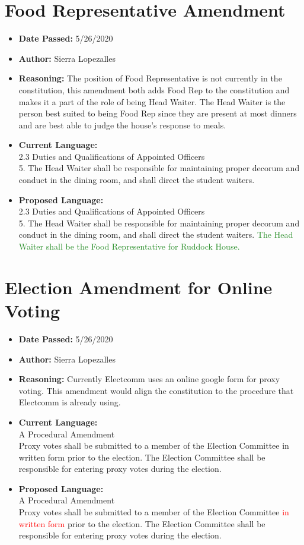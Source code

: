 \documentclass[10pt]{article} %
\begin{document}
\section{Food Representative Amendment}
\begin{itemize}
	\item \textbf{Date Passed:} 5/26/2020
	\item \textbf{Author:} Sierra Lopezalles
	\item \textbf{Reasoning:} The position of Food Representative is not currently in the constitution, this amendment both adds Food Rep to the constitution and makes it a part of the role of being Head Waiter. The Head Waiter is the person best suited to being Food Rep since they are present at most dinners and are best able to judge the house’s response to meals.
	\item \textbf{Current Language:} \\
	2.3 Duties and Qualifications of Appointed Officers \\
	5. The Head Waiter shall be responsible for maintaining proper decorum and conduct in the dining room, and shall direct the student waiters.
	\item \textbf{Proposed Language:} \\
	2.3 Duties and Qualifications of Appointed Officers \\
	5. The Head Waiter shall be responsible for maintaining proper decorum and conduct in the dining room, and shall direct the student waiters. \textcolor{ForestGreen}{The Head Waiter shall be the Food Representative for Ruddock House.}
\end{itemize}

\section{Election Amendment for Online Voting}
\begin{itemize}
	\item \textbf{Date Passed:} 5/26/2020
	\item \textbf{Author:} Sierra Lopezalles
	\item \textbf{Reasoning:} Currently Electcomm uses an online google form for proxy voting. This amendment would align the constitution to the procedure that Electcomm is already using.
	\item \textbf{Current Language:} \\
	A Procedural Amendment \\
	Proxy votes shall be submitted to a member of the Election Committee in written form prior to the election. The Election Committee shall be responsible for entering proxy votes during the election.
	\item \textbf{Proposed Language:} \\
	A Procedural Amendment \\
	Proxy votes shall be submitted to a member of the Election Committee \textcolor{red}{in written form} prior to the election. The Election Committee shall be responsible for entering proxy votes during the election. 
\end{itemize}
\end{document}
